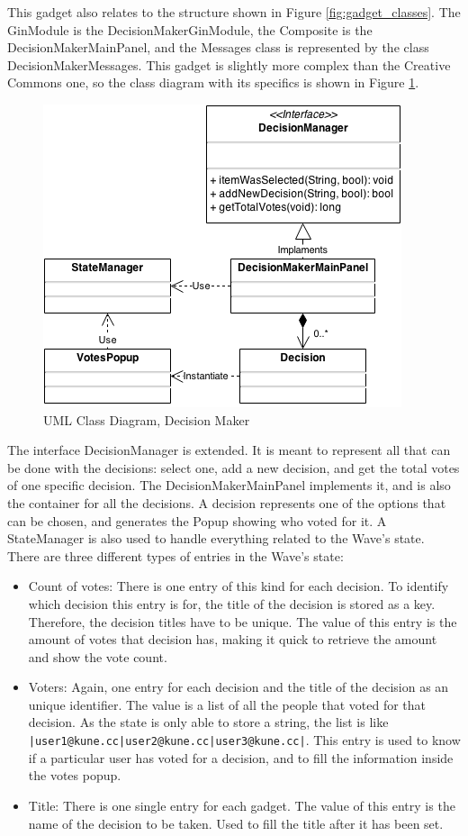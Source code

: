 This gadget also relates to the structure shown in Figure \ref{fig:gadget_classes}. The GinModule is the DecisionMakerGinModule, the Composite is the DecisionMakerMainPanel, and the Messages class is represented by the class DecisionMakerMessages. This gadget is slightly more complex than the Creative Commons one, so the class diagram with its specifics is shown in Figure \ref{fig:decision_maker_diagram}.
\begin{figure}[H]
  \center
    \includegraphics[keepaspectratio, scale=0.5]{Media/Diagrams/Gadget/DecisionMaker.png}
  \caption{UML Class Diagram, Decision Maker}
  \label{fig:decision_maker_diagram}
\end{figure}
The interface DecisionManager is extended. It is meant to represent all that can be done with the decisions: select one, add a new decision, and get the total votes of one specific decision. The DecisionMakerMainPanel implements it, and is also the container for all the decisions. A decision represents one of the options that can be chosen, and generates the Popup showing who voted for it. A StateManager is also used to handle everything related to the Wave's state.\\[.2cm]
There are three different types of entries in the Wave's state:
\begin{itemize}
  \item Count of votes: There is one entry of this kind for each decision. To identify which decision this entry is for, the title of the decision is stored as a key. Therefore, the decision titles have to be unique. The value of this entry is the amount of votes that decision has, making it quick to retrieve the amount and show the vote count.
  \item Voters: Again, one entry for each decision and the title of the decision as an unique identifier. The value is a list of all the people that voted for that decision. As the state is only able to store a string, the list is like \verb+|user1@kune.cc|user2@kune.cc|user3@kune.cc|+. This entry is used to know if a particular user has voted for a decision, and to fill the information inside the votes popup.
  \item Title: There is one single entry for each gadget. The value of this entry is the name of the decision to be taken. Used to fill the title after it has been set.
\end{itemize}
